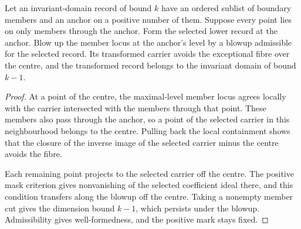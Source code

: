 \begin{lemma}
\label{hir:g1-selected-domain-after-special-step}
\leanok
Let an invariant-domain record of bound $k$ have an ordered sublist of
boundary members and an anchor on a positive number of them. Suppose
every point lies on only members through the anchor. Form the selected
lower record at the anchor. Blow up the member locus at the anchor's
level by a blowup admissible for the selected record. Its transformed
carrier avoids the exceptional fibre over the centre, and the
transformed record belongs to the invariant domain of bound $k-1$.
\end{lemma}
\begin{proof}
At a point of the centre, the maximal-level member locus agrees
locally with the carrier intersected with the members through that
point. These members also pass through the anchor, so a point of the
selected carrier in this neighbourhood belongs to the centre. Pulling
back the local containment shows that the closure of the inverse
image of the selected carrier minus the centre avoids the fibre.

Each remaining point projects to the selected carrier off the centre.
The positive mask criterion gives nonvanishing of the selected
coefficient ideal there, and this condition transfers along the blowup
off the centre. Taking a
nonempty member cut gives the dimension bound $k-1$, which persists
under the blowup. Admissibility gives well-formedness, and the positive
mark stays fixed.
\end{proof}

